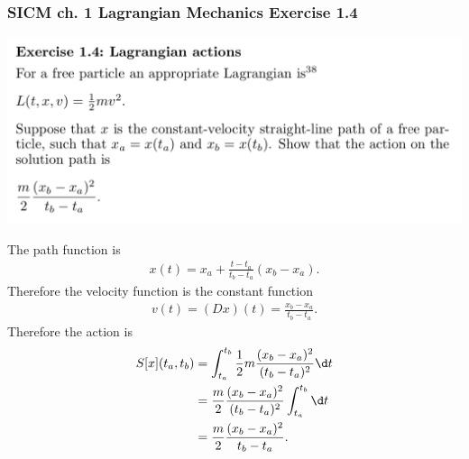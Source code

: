 \subsubsection*{SICM ch. 1 Lagrangian Mechanics Exercise 1.4}
\begin{mdframed}
  \includegraphics[width=400pt]{img/physics--classical-mechanics--sicm--1-4.png}
\end{mdframed}
The path function is
\begin{align*}
  x(t) = x_a + \frac{t - t_a}{t_b - t_a}(x_b - x_a).
\end{align*}
Therefore the velocity function is the constant function
\begin{align*}
  v(t) = (D x)(t) = \frac{x_b - x_a}{t_b - t_a}.
\end{align*}
Therefore the action is
\begin{align*}
  S[x](t_a, t_b) &= \int_{t_a}^{t_b}  \frac{1}{2}m \frac{(x_b - x_a)^2}{(t_b - t_a)^2} \d t \\
                 &= \frac{m}{2} \frac{(x_b - x_a)^2}{(t_b - t_a)^2}\int_{t_a}^{t_b} \d t \\
                 &= \frac{m}{2} \frac{(x_b - x_a)^2}{t_b - t_a}.
\end{align*}
